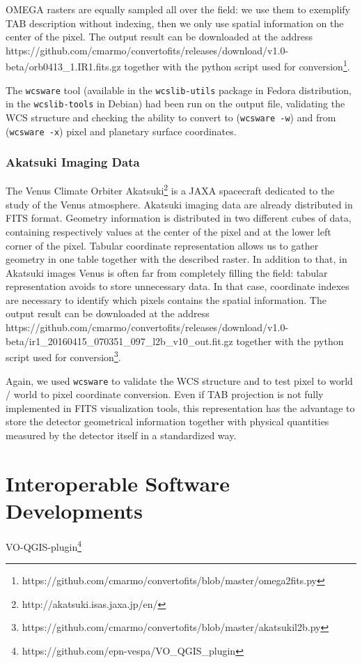 OMEGA rasters are equally sampled all over the field: we use them to exemplify
TAB description without indexing, then we only use spatial information on the center
of the pixel. 
The output result can be downloaded at the address https://github.com/cmarmo/convertofits/releases/download/v1.0-beta/orb0413\_1.IR1.fits.gz together with the python script
used for conversion\footnote{https://github.com/cmarmo/convertofits/blob/master/omega2fits.py}.

The \texttt{wcsware} tool (available in the \texttt{wcslib-utils} package in Fedora
distribution, in the \texttt{wcslib-tools} in Debian) had been run on the output file,
validating the WCS structure and checking the ability to convert to (\texttt{wcsware -w})
and from (\texttt{wcsware -x}) pixel and planetary surface coordinates.

\subsubsection{Akatsuki Imaging Data}
The Venus Climate Orbiter Akatsuki\footnote{http://akatsuki.isas.jaxa.jp/en/} is a JAXA
spacecraft dedicated to the study of the Venus atmosphere.
Akatsuki imaging data are already distributed in FITS format.
Geometry information is distributed in two different cubes of data, containing respectively 
values at the center of the pixel and at the lower left corner of the pixel.
Tabular coordinate representation allows us to gather geometry in one table together with
the described raster.
In addition to that, in Akatsuki images Venus is often far from completely filling the field:
tabular representation avoids to store unnecessary data. 
In that case, coordinate indexes are necessary to identify which pixels contains the spatial
information.
The output result can be downloaded at the address https://github.com/cmarmo/convertofits/releases/download/v1.0-beta/ir1\_20160415\_070351\_097\_l2b\_v10\_out.fit.gz
together with the python script
used for conversion\footnote{https://github.com/cmarmo/convertofits/blob/master/akatsukil2b.py}.

Again, we used \texttt{wcsware} to validate the WCS structure and to test pixel to world /
world to pixel coordinate conversion.
Even if TAB projection is not fully implemented in FITS visualization tools, this representation
has the advantage to store the detector geometrical information together with physical
quantities measured by the detector itself in a standardized way.

\section{Interoperable Software Developments}
\label{sec:softdev}
VO-QGIS-plugin\footnote{https://github.com/epn-vespa/VO\_QGIS\_plugin}

